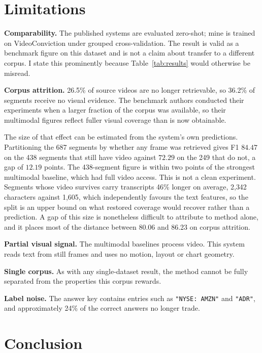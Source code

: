 \documentclass[conference]{IEEEtran}
\begin{document}
\section{Limitations}

\textbf{Comparability.} The published systems are evaluated zero-shot; mine is
trained on VideoConviction under grouped cross-validation. The result is valid
as a benchmark figure on this dataset and is not a claim about transfer to a
different corpus. I state this prominently because Table~\ref{tab:results} would
otherwise be misread.

\textbf{Corpus attrition.} 26.5\% of source videos are no longer retrievable, so
36.2\% of segments receive no visual evidence. The benchmark authors conducted
their experiments when a larger fraction of the corpus was available, so their
multimodal figures reflect fuller visual coverage than is now obtainable.

The size of that effect can be estimated from the system's own predictions.
Partitioning the 687 segments by whether any frame was retrieved gives F1
$84.47$ on the 438 segments that still have video against $72.29$ on the 249
that do not, a gap of $12.19$ points. The 438-segment figure is within two
points of the strongest multimodal baseline, which had full video access. This
is not a clean experiment. Segments whose video survives carry transcripts
46\% longer on average, 2{,}342 characters against 1{,}605, which independently
favours the text features, so the split is an upper bound on what restored
coverage would recover rather than a prediction. A gap of this size is
nonetheless difficult to attribute to method alone, and it places most of the
distance between 80.06 and 86.23 on corpus attrition.

\textbf{Partial visual signal.} The multimodal baselines process video. This
system reads text from still frames and uses no motion, layout or chart
geometry.

\textbf{Single corpus.} As with any single-dataset result, the method cannot be
fully separated from the properties this corpus rewards.

\textbf{Label noise.} The answer key contains entries such as
\texttt{"NYSE: AMZN"} and \texttt{"ADR"}, and approximately 24\% of the correct answers
no longer trade.

\section{Conclusion}
\end{document}
